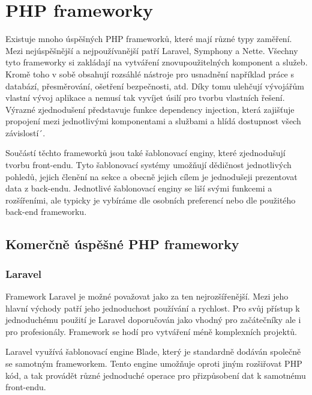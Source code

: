 \documentclass[czech,BP]{thesiskiv}
\begin{document}
\section{PHP frameworky}
\par Existuje mnoho úspěšných PHP frameworků, které mají různé typy zaměření. Mezi nejúspěšnější a nejpoužívanější patří Laravel, Symphony a Nette. Všechny tyto frameworky si zakládají na vytváření znovupoužitelných komponent a služeb. Kromě toho v sobě obsahují rozsáhlé nástroje pro usnadnění například práce s databází, přesměrování, ošetření bezpečnosti, atd. Díky tomu ulehčují vývojářům vlastní vývoj aplikace a nemusí tak vyvíjet úsilí pro tvorbu vlastních řešení. Výrazné zjednodušení představuje funkce dependency injection, která zajišťuje propojení mezi jednotlivými komponentami a službami a hlídá dostupnost všech závislostí´.
\par Součástí těchto frameworků jsou také šablonovací enginy, které zjednodušují tvorbu front-endu. Tyto šablonovací systémy umožňují dědičnost jednotlivých pohledů, jejich členění na sekce a obecně jejich cílem je jednodušeji prezentovat data z back-endu. Jednotlivé šablonovací enginy se liší svými funkcemi a rozšířeními, ale typicky je vybíráme dle osobních preferencí nebo dle použitého back-end frameworku.
\subsection{Komerčně úspěšné PHP frameworky}
\subsubsection{Laravel}
\par Framework Laravel je možné považovat jako za ten nejrozšířenější. Mezi jeho hlavní východy patří jeho jednoduchost používání a rychlost. Pro svůj přístup k jednoduchému použití je Laravel doporučován jako vhodný pro začátečníky ale i pro profesionály. Framework se hodí pro vytváření méně komplexních projektů.
\par Laravel využívá šablonovací engine Blade, který je standardně dodáván společně se samotným frameworkem. Tento engine umožňuje oproti jiným rozšiřovat PHP kód, a tak provádět různé jednoduché operace pro přizpůsobení dat k samotnému front-endu.
\end{document}
